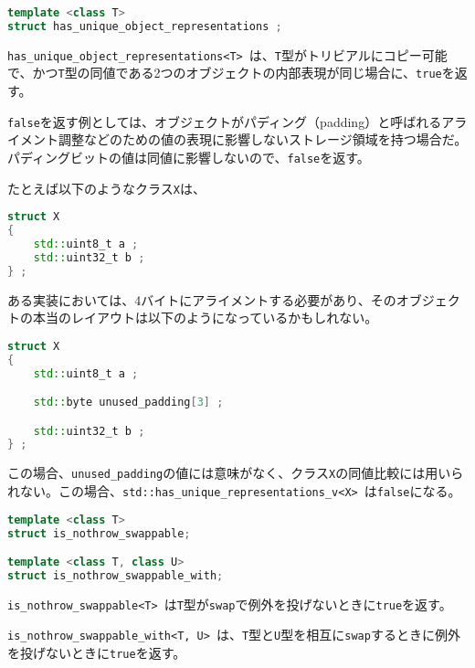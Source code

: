 %

\bgroup
\begin{lstlisting}[language=C++]
template <class T>
struct has_unique_object_representations ;
\end{lstlisting}
\egroup

\lstinline!has_unique_object_representations<T>!~は、\lstinline!T!型がトリビアルにコピー可能で、かつ\lstinline!T!型の同値である2つのオブジェクトの内部表現が同じ場合に、\lstinline!true!を返す。

\lstinline!false!を返す例としては、オブジェクトがパディング（padding）と呼ばれるアライメント調整などのための値の表現に影響しないストレージ領域を持つ場合だ。パディングビットの値は同値に影響しないので、\lstinline!false!を返す。

たとえば以下のようなクラス\lstinline!X!は、
\begin{lstlisting}[language=C++]
struct X
{
    std::uint8_t a ;
    std::uint32_t b ;
} ;
\end{lstlisting}
ある実装においては、4バイトにアライメントする必要があり、そのオブジェクトの本当のレイアウトは以下のようになっているかもしれない。

\begin{lstlisting}[language=C++]
struct X
{
    std::uint8_t a ;

    std::byte unused_padding[3] ;

    std::uint32_t b ;
} ;
\end{lstlisting}

この場合、\lstinline!unused_padding!の値には意味がなく、クラス\lstinline!X!の同値比較には用いられない。この場合、\lstinline!std::has_unique_representations_v<X>!~は\lstinline!false!になる。

%

\bgroup
\begin{lstlisting}[language=C++]
template <class T>
struct is_nothrow_swappable;

template <class T, class U>
struct is_nothrow_swappable_with;
\end{lstlisting}
\egroup

\lstinline!is_nothrow_swappable<T>!~は\lstinline!T!型が\lstinline!swap!で例外を投げないときに\lstinline!true!を返す。

\lstinline!is_nothrow_swappable_with<T, U>!~は、\lstinline!T!型と\lstinline!U!型を相互に\lstinline!swap!するときに例外を投げないときに\lstinline!true!を返す。
